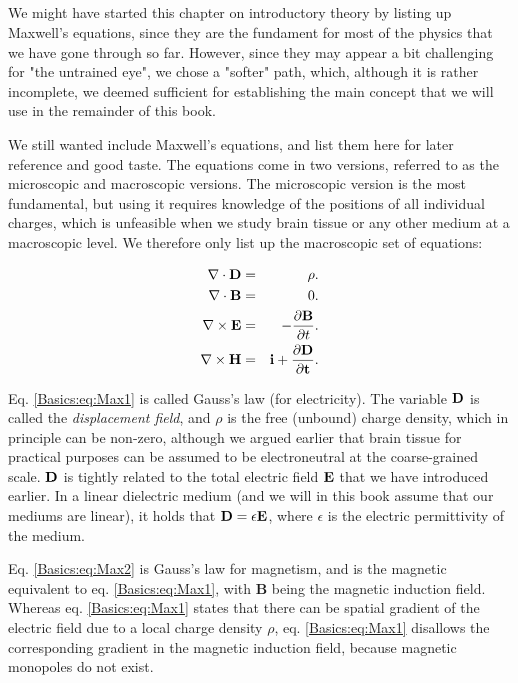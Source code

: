 

\subsection{}
We might have started this chapter on introductory theory by listing up Maxwell's equations, since they are the fundament for most of the physics that we have gone through so far. However, since they may appear a bit challenging for "the untrained eye", we chose a "softer" path, which, although it is rather incomplete, we deemed sufficient for establishing the main concept that we will use in the remainder of this book. 

We still wanted include Maxwell's equations, and list them here for later reference and good taste.
The equations come in two versions, referred to as the microscopic and macroscopic versions. The microscopic version is the most fundamental, but using it requires knowledge of the positions of all individual charges, which is unfeasible when we study brain tissue or any other medium at a macroscopic level. We therefore only list up the macroscopic set of equations: 

\begin{eqnarray}
\nabla\cdot {\bf D} & = & \rho. \label{Basics:eq:Max1} \\
\nabla \cdot {\bf B} & = & 0.  \label{Basics:eq:Max2} \\
\nabla \times {\bf E} & = & - \frac{\partial {\bf B}}{\partial t}.  \label{Basics:eq:Max3} \\
\nabla \times {\bf H} & = & \bf{i} + \frac{\partial {\bf D}}{\partial t}.  \label{Basics:eq:Max4}
\label{Basics:eq:Maxwell}
\end{eqnarray}

Eq. \ref{Basics:eq:Max1} is called Gauss's law (for electricity). The variable ${\bf D}$ is called the \textit{displacement field}, and $\rho$ is the free (unbound) charge density, which in principle can be non-zero, although we argued earlier that brain tissue for practical purposes can be assumed to be electroneutral at the coarse-grained scale. ${\bf D}$ is tightly related to the total electric field ${\bf E}$ that we have introduced earlier. In a linear dielectric medium (and we will in this book assume that our mediums are linear), it holds that ${\bf D} = \epsilon {\bf E}$, where $\epsilon$ is the electric permittivity of the medium. 

Eq. \ref{Basics:eq:Max2} is Gauss's law for magnetism, and is the magnetic equivalent to eq. \ref{Basics:eq:Max1}, with {\bf B} being the magnetic induction field.  Whereas eq. \ref{Basics:eq:Max1} states that there can be spatial gradient of the electric field due to a local charge density $\rho$, eq. \ref{Basics:eq:Max1} disallows the corresponding gradient in the magnetic induction field, because magnetic monopoles do not exist. 

